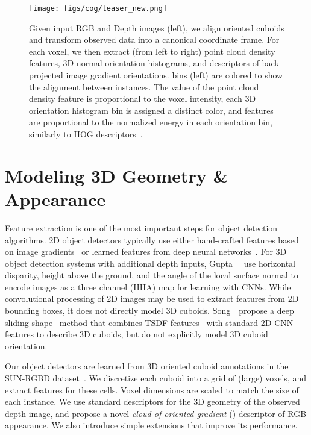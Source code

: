 \begin{figure*}[!ht]
  \centering
  \texttt{[image: figs/cog/teaser\_new.png]}
  \caption{Given input RGB and Depth images (left), we align oriented cuboids and transform observed data into a canonical coordinate frame.  
  For each voxel, we then extract (from left to right) point cloud density features, 
  3D normal orientation histograms, and \cog descriptors of back-projected image gradient orientations.
  \cog bins (left) are colored to show the alignment between instances. 
The value of the point cloud density feature is proportional to the voxel intensity, 
each 3D orientation histogram bin is assigned a distinct color,
and \cog features are proportional to the normalized energy in
each orientation bin, similarly to HOG descriptors~\cite{dalal2005histograms}.}
\label{fig:cog_bins}
\end{figure*}

\section{Modeling 3D Geometry \& Appearance}
\label{sec:cog}

Feature extraction is one of the most important steps for object detection algorithms. 2D object detectors typically
use either hand-crafted features based on image gradients~\cite{dalal2005histograms,felzenszwalb2010dpm} or learned features
from deep neural networks~\cite{girshick2014rich,girshick15fastrcnn,ren2015faster,he2016res,lin2017focal}. For 3D object 
detection systems with additional depth inputs, Gupta~\etal~\cite{gupta2014learning} use horizontal disparity, height above the ground, 
and the angle of the local surface normal to encode images as a three channel (HHA) map for learning with CNNs.  While convolutional processing of 2D images may be used to extract features from 2D bounding boxes, it does not directly model 3D cuboids.
Song~\etal~propose a deep sliding shape~\cite{song2016deep} method that 
combines TSDF features~\cite{song2014sliding} with standard
2D CNN features to describe 3D cuboids, but do not explicitly model 3D cuboid orientation.

Our object detectors are learned from 3D oriented cuboid annotations in the SUN-RGBD dataset~\cite{song2015sun}.
We discretize each cuboid into a  grid of (large) voxels, and extract features for these  cells.  Voxel dimensions are scaled to match the size of each instance. We use standard descriptors for the 3D geometry of the observed depth image, and propose a novel \emph{cloud of oriented gradient} (\cog) descriptor of RGB appearance. We also introduce simple extensions that improve its performance.


